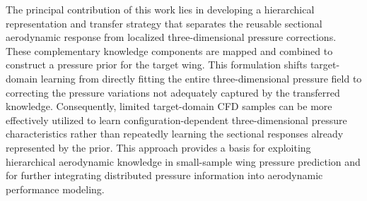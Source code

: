 The principal contribution of this work lies in developing a hierarchical representation and transfer strategy that separates the reusable sectional aerodynamic response from localized three-dimensional pressure corrections. These complementary knowledge components are mapped and combined to construct a pressure prior for the target wing. This formulation shifts target-domain learning from directly fitting the entire three-dimensional pressure field to correcting the pressure variations not adequately captured by the transferred knowledge. Consequently, limited target-domain CFD samples can be more effectively utilized to learn configuration-dependent three-dimensional pressure characteristics rather than repeatedly learning the sectional responses already represented by the prior. This approach provides a basis for exploiting hierarchical aerodynamic knowledge in small-sample wing pressure prediction and for further integrating distributed pressure information into aerodynamic performance modeling.
